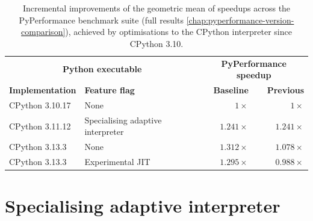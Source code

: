 \begin{table}[H]
  \caption{Incremental improvements of the geometric mean of speedups across the PyPerformance benchmark suite (full results \autoref{chap:pyperformance-version-comparison}), achieved by optimisations to the CPython interpreter since CPython 3.10.}
  \label{tab:faster-cpython}
  \centering
  \begin{tabular}{llrr}
    \toprule
    \multicolumn{2}{c}{\textbf{Python executable}} & \multicolumn{2}{c}{\textbf{PyPerformance speedup}}\\
    \cmidrule(r){1-2} \cmidrule(r){3-4}
    \textbf{Implementation} & \textbf{Feature flag} & \textbf{Baseline} & \textbf{Previous} \\
    \midrule
    CPython 3.10.17 & None & $1\times$ & $1\times$ \\
    CPython 3.11.12 & Specialising adaptive interpreter & $1.241\times$ & $1.241\times$ \\
    CPython 3.13.3 & None & $1.312\times$ & $1.078\times$ \\
    CPython 3.13.3 & Experimental JIT & $1.295\times$ & $0.988\times$ \\
    \bottomrule
  \end{tabular}
\end{table}


\section{Specialising adaptive interpreter}
\label{sec:specialising-adaptive-interpreter}

